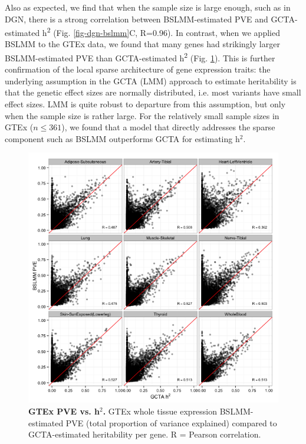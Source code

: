 \documentclass[10pt,letterpaper]{article}
\begin{document}
Also as expected, we find that when the sample size is large enough, such as in DGN, there is a strong correlation between BSLMM-estimated PVE and GCTA-estimated h\textsuperscript{2} (Fig. \ref{fig-dgn-bslmm}C, R=0.96). In contrast, when we applied BSLMM to the GTEx data, we found that many genes had strikingly larger BSLMM-estimated PVE than GCTA-estimated h\textsuperscript{2} (Fig. \ref{fig-gtex-pve-h2}). This is further confirmation of the local sparse architecture of gene expression traits: the underlying assumption in the GCTA (LMM) approach to estimate heritability is that the genetic effect sizes are normally distributed, i.e. most variants have small effect sizes. LMM is quite robust to departure from this assumption, but only when the sample size is rather large. For the relatively small sample sizes in GTEx (\(n \leq 361\)), we found that a model that directly addresses the sparse component such as BSLMM outperforms GCTA for estimating h$^2$.

\begin{figure}[h]
\includegraphics[width=12cm]{Figures/Fig-GTEx_TW_PVE_v_h2.png}
\caption{{\bf GTEx PVE vs. h$^2$.} 
GTEx whole tissue expression BSLMM-estimated PVE (total proportion of variance 
explained) compared to GCTA-estimated heritability per gene. R = Pearson correlation.}
\label{fig-gtex-pve-h2}
\end{figure}
\end{document}
